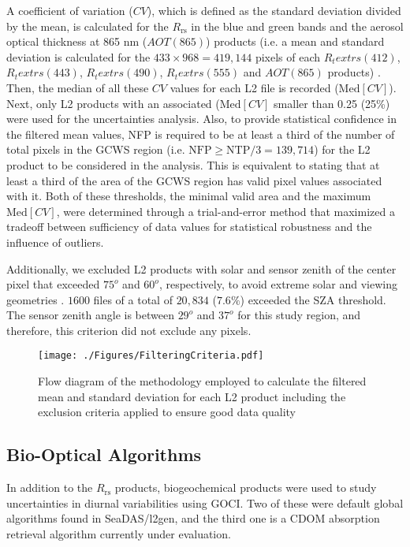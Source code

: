 \documentclass[remotesensing,article,submit,moreauthors,pdftex,10pt,a4paper]{Definitions/mdpi}
\begin{document}
A coefficient of variation ($CV$), which is defined as the standard deviation divided by the mean, is calculated for the $R_\text{rs}$ in the blue and green bands and the aerosol optical thickness at 865 nm ($AOT(865)$) products (i.e. a mean and standard deviation is calculated for the $433\times968=419,144$ pixels of each $R_text{rs}(412)$, $R_text{rs}(443)$, $R_text{rs}(490)$, $R_text{rs}(555)$ and $AOT(865)$ products) \cite{Bailey2006}. Then, the median of all these $CV$ values for each L2 file is recorded ($\text{Med}[CV]$). Next, only L2 products with an associated ($\text{Med}[CV]$ smaller than 0.25 (25\%) were used for the uncertainties analysis. Also, to provide statistical confidence in the filtered mean values, NFP is required to be at least a third of the number of total pixels in the GCWS region (i.e. $\text{NFP}\geq \text{NTP}/3 = 139,714$) for the L2 product to be considered in the analysis. This is equivalent to stating that at least a third of the area of the GCWS region has valid pixel values associated with it. Both of these thresholds, the minimal valid area and the maximum $\text{Med}[CV]$, were determined through a trial-and-error method that maximized a tradeoff between sufficiency of data values for statistical robustness and the influence of outliers.

Additionally, we excluded L2 products with solar and sensor zenith of the center pixel that exceeded $75^o$ and $60^o$, respectively, to avoid extreme solar and viewing geometries \cite{Bailey2006}. $1600$ files of a total of $20,834$ ($7.6\%$) exceeded the SZA threshold. The sensor zenith angle is between $29^o$ and $37^o$ for this study region, and therefore, this criterion did not exclude any pixels.

\begin{figure}[ht]
  \centering
    \texttt{[image: ./Figures/FilteringCriteria.pdf]}
  \caption{Flow diagram of the methodology employed to calculate the filtered mean and standard deviation for each L2 product including the exclusion criteria applied to ensure good data quality}\label{fig:FilteringCriteria}
\end{figure}

\subsection{Bio-Optical Algorithms} \label{subsec:bioopalg}
In addition to the $R_\text{rs}$ products,  biogeochemical products were used to study uncertainties in diurnal variabilities using GOCI. Two of these were default global algorithms found in SeaDAS/l2gen, and the third one is a CDOM absorption retrieval algorithm currently under evaluation. 
\end{document}
